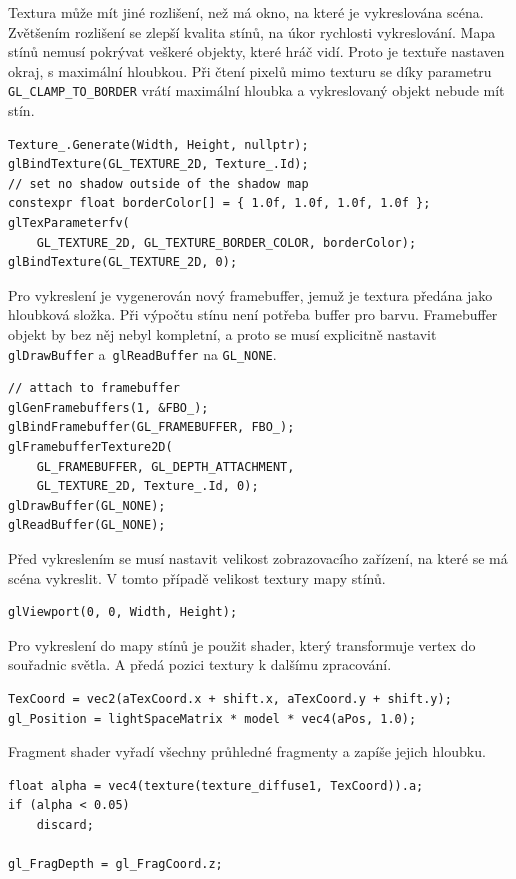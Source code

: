 \documentclass[thesis=M,czech]{FITthesis}[2019/12/23]
\begin{document}
Textura může mít jiné rozlišení, než má okno, na které je vykreslována scéna. Zvětšením rozlišení se zlepší kvalita stínů, na úkor rychlosti vykreslování. Mapa stínů nemusí pokrývat veškeré objekty, které hráč vidí. Proto je textuře nastaven okraj, s maximální hloubkou. Při čtení pixelů mimo texturu se díky parametru \texttt{GL\_CLAMP\_TO\_BORDER} vrátí maximální hloubka a vykreslovaný objekt nebude mít stín.

\begin{verbatim}
Texture_.Generate(Width, Height, nullptr);
glBindTexture(GL_TEXTURE_2D, Texture_.Id);
// set no shadow outside of the shadow map
constexpr float borderColor[] = { 1.0f, 1.0f, 1.0f, 1.0f };
glTexParameterfv(
    GL_TEXTURE_2D, GL_TEXTURE_BORDER_COLOR, borderColor);
glBindTexture(GL_TEXTURE_2D, 0);
\end{verbatim}

Pro vykreslení je vygenerován nový framebuffer, jemuž je textura předána jako hloubková složka. Při výpočtu stínu není potřeba buffer pro barvu. Framebuffer objekt by bez něj nebyl kompletní, a proto se musí explicitně nastavit \texttt{glDrawBuffer} a~\texttt{glReadBuffer} na \texttt{GL\_NONE}. 

\begin{verbatim}
// attach to framebuffer
glGenFramebuffers(1, &FBO_);
glBindFramebuffer(GL_FRAMEBUFFER, FBO_);
glFramebufferTexture2D(
    GL_FRAMEBUFFER, GL_DEPTH_ATTACHMENT,
    GL_TEXTURE_2D, Texture_.Id, 0);
glDrawBuffer(GL_NONE);
glReadBuffer(GL_NONE);
\end{verbatim}

Před vykreslením se musí nastavit velikost zobrazovacího zařízení, na které se má scéna vykreslit. V tomto případě velikost textury mapy stínů.

\begin{verbatim}
glViewport(0, 0, Width, Height);
\end{verbatim}

Pro vykreslení do mapy stínů je použit shader, který transformuje vertex do souřadnic světla. A předá pozici textury k dalšímu zpracování.

\begin{verbatim}
TexCoord = vec2(aTexCoord.x + shift.x, aTexCoord.y + shift.y);
gl_Position = lightSpaceMatrix * model * vec4(aPos, 1.0);
\end{verbatim}

Fragment shader vyřadí všechny průhledné fragmenty a zapíše jejich hloubku.

\begin{verbatim}
float alpha = vec4(texture(texture_diffuse1, TexCoord)).a;
if (alpha < 0.05)
    discard;

gl_FragDepth = gl_FragCoord.z;
\end{verbatim}
\end{document}
